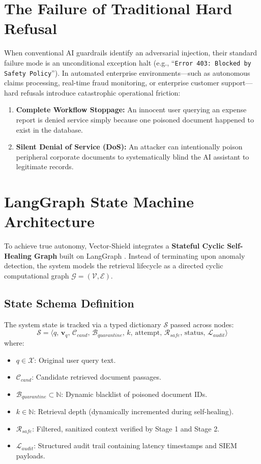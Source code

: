 \label{chap:langgraph}
\section{The Failure of Traditional Hard Refusal}
When conventional AI guardrails identify an adversarial injection, their standard failure mode is an unconditional exception halt (e.g., \enquote{\texttt{Error 403: Blocked by Safety Policy}}). In automated enterprise environments—such as autonomous claims processing, real-time fraud monitoring, or enterprise customer support—hard refusals introduce catastrophic operational friction:
\begin{enumerate}
    \item \textbf{Complete Workflow Stoppage:} An innocent user querying an expense report is denied service simply because one poisoned document happened to exist in the database.
    \item \textbf{Silent Denial of Service (DoS):} An attacker can intentionally poison peripheral corporate documents to systematically blind the AI assistant to legitimate records.
\end{enumerate}

\section{LangGraph State Machine Architecture}
To achieve true autonomy, Vector-Shield integrates a \textbf{Stateful Cyclic Self-Healing Graph} built on LangGraph \cite{langgraph2024}. Instead of terminating upon anomaly detection, the system models the retrieval lifecycle as a directed cyclic computational graph $\mathcal{G} = (\mathcal{V}, \mathcal{E})$.

\subsection{State Schema Definition}
The system state is tracked via a typed dictionary $\mathcal{S}$ passed across nodes:
\begin{equation}
    \mathcal{S} = \langle q,\, \mathbf{v}_q,\, \mathcal{C}_{cand},\, \mathcal{B}_{quarantine},\, k,\, \text{attempt},\, \mathcal{R}_{safe},\, \text{status},\, \mathcal{L}_{audit} \rangle
\end{equation}
where:
\begin{itemize}
    \item $q \in \mathcal{X}$: Original user query text.
    \item $\mathcal{C}_{cand}$: Candidate retrieved document passages.
    \item $\mathcal{B}_{quarantine} \subset \mathbb{N}$: Dynamic blacklist of poisoned document IDs.
    \item $k \in \mathbb{N}$: Retrieval depth (dynamically incremented during self-healing).
    \item $\mathcal{R}_{safe}$: Filtered, sanitized context verified by Stage 1 and Stage 2.
    \item $\mathcal{L}_{audit}$: Structured audit trail containing latency timestamps and SIEM payloads.
\end{itemize}

